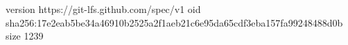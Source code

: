 version https://git-lfs.github.com/spec/v1
oid sha256:17e2eab5be34a46910b2525a2f1aeb21c6e95da65cdf3eba157fa99248488d0b
size 1239
